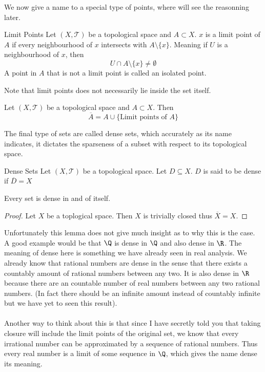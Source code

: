 We now give a name to a special type of points, where will see the reasonning later. 

\begin{defn}{Limit Points}{} Let $(X,\mathcal{T})$ be a topological space and $A\subset X$. $x$ is a limit point of $A$ if every neighbourhood of $x$ intersects with $A\setminus\{x\}$. Meaning if $U$ is a neighbourhood of $x$, then $$U\cap A\setminus\{x\}\neq\emptyset$$ A point in $A$ that is not a limit point is called an isolated point. 
\end{defn}

Note that limit points does not necessarily lie inside the set itself. 

\begin{prp}{}{} Let $(X,\mathcal{T})$ be a topological space and $A\subset X$. Then $$\overline{A}=A\cup\{\text{Limit points of }A\}$$
\end{prp}

The final type of sets are called dense sets, which accurately as its name indicates, it dictates the sparseness of a subset with respect to its topological space. 

\begin{defn}{Dense Sets}{} Let $(X,\mathcal{T})$ be a topological space. Let $D\subseteq X$. $D$ is said to be dense if $\overline{D}=X$
\end{defn}

\begin{lmm}{}{} Every set is dense in and of itself. \tcbline
\begin{proof}
Let $X$ be a toplogical space. Then $X$ is trivially closed thus $\overline{X}=X$. 
\end{proof}
\end{lmm}

Unfortunately this lemma does not give much insight as to why this is the case. A good example would be that $\Q$ is dense in $\Q$ and also dense in $\R$. The meaning of dense here is something we have already seen in real analysis. We already know that rational numbers are dense in the sense that there exists a countably amount of rational numbers between any two. It is also dense in $\R$ because there are an countable number of real numbers between any two rational numbers. (In fact there should be an infinite amount instead of countably infinite but we have yet to seen this result). \\~\\
Another way to think about this is that since I have secretly told you that taking closure will include the limit points of the original set, we know that every irrational number can be approximated by a sequence of rational numbers. Thus every real number is a limit of some sequence in $\Q$, which gives the name dense its meaning. 

